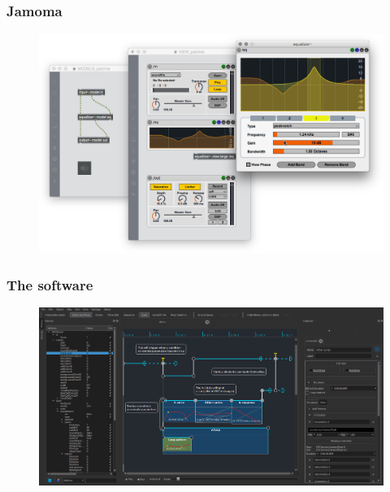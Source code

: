 \documentclass{beamer}
\begin{document}
\begin{frame}
    \frametitle{Jamoma}       
    
    \begin{figure}
        \centering
        \includegraphics[width=\textwidth]{images/jamoma.jpg}
    \end{figure}
\end{frame}

\begin{frame}
    \frametitle{The software}    
    \begin{figure}
    	\centering
    	\includegraphics[width=\textwidth]{images/iscore.png}
    \end{figure}    
\end{frame}
\end{document}
